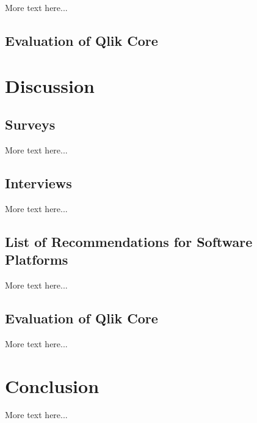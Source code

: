 \documentclass{article}
\begin{document}
More text here...

\subsection{Evaluation of Qlik Core}


\section{Discussion}
\subsection{Surveys}
More text here...
\subsection{Interviews}
More text here...
\subsection{List of Recommendations for Software Platforms}
More text here...
\subsection{Evaluation of Qlik Core}
More text here...
\section{Conclusion}
More text here...
\newpage


\end{document}
